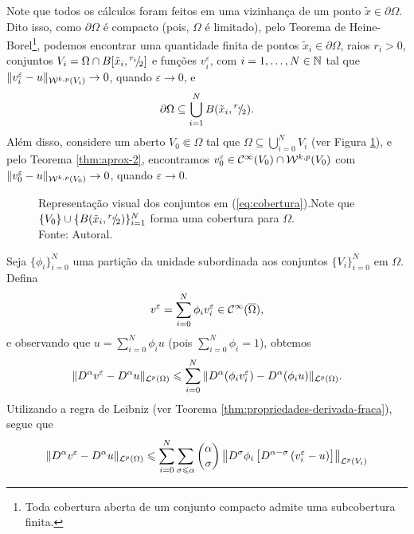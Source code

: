 \begin{prf}
    Note que todos os cálculos foram feitos em uma vizinhança de um ponto $\tilde x \in \partial\Omega$. Dito isso, como $\partial \Omega$ é compacto (pois, $\Omega$ é limitado), pelo Teorema de Heine-Borel\footnote{Toda cobertura aberta de um conjunto compacto admite uma subcobertura finita.}, podemos encontrar uma quantidade finita de pontos $\tilde x_i \in \partial \Omega$, raios $r_i > 0$, conjuntos $V_i = \Omega \cap B[\tilde x_i,{}^{r_i\,}\!\!/\!_{2}]$ e funções $v_i^\varepsilon$, com $i = 1,\dots,N \in \mathbb{N}$ tal que $\Vert v_i^\varepsilon - u \Vert_{\mathcal{W}^{k,p}(V_i)} \to 0$, quando $\varepsilon \to 0$, e 
    \begin{equation} \label{eq:cobertura}
        \partial\Omega \subseteq \bigcup_{i=1}^N B(\tilde x_i, {}^{r_i}\!\!/\!_{2}).
    \end{equation}
    Além disso, considere um aberto $V_0 \Subset \Omega$ tal que $\Omega \subseteq \bigcup_{i=0}^N V_i$ (ver Figura \ref{fig:coberturafronteirav0}), e pelo Teorema \ref{thm:aprox-2}, encontramos $v_0^\varepsilon \in \mathcal{C}^{\infty}(V_0) \cap \mathcal{W}^{k,p}(V_0)$ com $\Vert v_0^\varepsilon - u \Vert_{\mathcal{W}^{k,p}(V_0)} \to 0$, quando $\varepsilon \to 0$.
    \begin{figure}
        \centering
        
        \caption{Representação visual dos conjuntos em (\ref{eq:cobertura}).Note que $\{V_0\} \cup \{B (\tilde x_i, {}^{r_i}\!\!/\!_{2})\}_{i=1}^N$ forma uma cobertura para $\Omega$. \\Fonte: Autoral.}
        \label{fig:coberturafronteirav0}
    \end{figure}
    Seja $\{\phi_i\}_{i=0}^N$ uma partição da unidade subordinada aos conjuntos $\{V_i\}_{i=0}^N$ em $\Omega$.
    Defina
    \[
        v^\varepsilon = \sum_{i=0}^N \phi_i v_i^\varepsilon \in \mathcal{C}^{\infty}(\overline\Omega),
    \]
    e observando que $u = \sum_{i=0}^N \phi_i u$ (pois $\sum_{i=0}^N \phi_i = 1$), obtemos
    \[
        \Vert D^\alpha v^\varepsilon - D^\alpha u \Vert_{\mathcal{L}^p(\Omega)} \leqslant \sum_{i=0}^N \Vert D^\alpha (\phi_i v_i^\varepsilon) - D^\alpha(\phi_i u) \Vert_{\mathcal{L}^p(\Omega)}.
    \]
    Utilizando a regra de Leibniz (ver Teorema \ref{thm:propriedades-derivada-fraca}), segue que
    \[
        \begin{aligned}
            \Vert D^\alpha v^\varepsilon - D^\alpha u \Vert_{\cL^p(\Omega)} &\leqslant \sum_{i=0}^N\sum_{\sigma \leqslant \alpha} \binom{\alpha}{\sigma} \left\Vert  D^{\sigma} \phi_i \left[ D^{\alpha - \sigma} \left( v_i^\varepsilon - u \right) \right] \right\Vert _{\cL^p(V_i)}\\ 

\end{aligned}\]
\end{prf}
